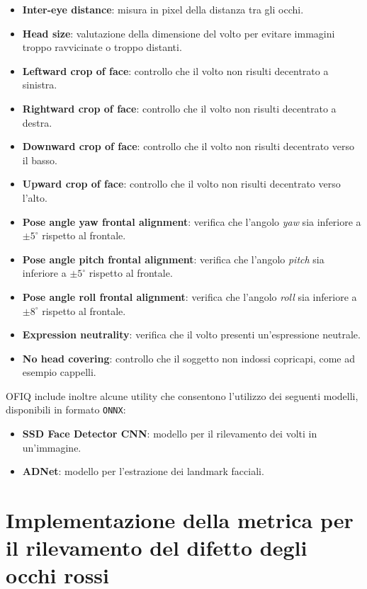 \documentclass[12pt,a4paper,openright,twoside]{book}
\begin{document}
\begin{itemize}
    \item \textbf{Inter-eye distance}: misura in pixel della distanza tra gli occhi.
    \item \textbf{Head size}: valutazione della dimensione del volto per evitare immagini troppo ravvicinate o troppo distanti.
    \item \textbf{Leftward crop of face}: controllo che il volto non risulti decentrato a sinistra.
    \item \textbf{Rightward crop of face}: controllo che il volto non risulti decentrato a destra.
    \item \textbf{Downward crop of face}: controllo che il volto non risulti decentrato verso il basso.
    \item \textbf{Upward crop of face}: controllo che il volto non risulti decentrato verso l'alto.
    \item \textbf{Pose angle yaw frontal alignment}: verifica che l'angolo \textit{yaw} sia inferiore a \(\pm 5^\circ\) rispetto al frontale.
    \item \textbf{Pose angle pitch frontal alignment}: verifica che l'angolo \textit{pitch} sia inferiore a \(\pm 5^\circ\) rispetto al frontale.
    \item \textbf{Pose angle roll frontal alignment}: verifica che l'angolo \textit{roll} sia inferiore a \(\pm 8^\circ\) rispetto al frontale.
    \item \textbf{Expression neutrality}: verifica che il volto presenti un'espressione neutrale.
    \item \textbf{No head covering}: controllo che il soggetto non indossi copricapi, come ad esempio cappelli.
\end{itemize}

OFIQ include inoltre alcune utility che consentono l'utilizzo dei seguenti modelli, disponibili in formato \texttt{ONNX}:  
\begin{itemize}
    \item \textbf{SSD Face Detector CNN}: modello per il rilevamento dei volti in un'immagine.
    \item \textbf{ADNet}: modello per l'estrazione dei landmark facciali.
\end{itemize}


\chapter{Implementazione della metrica per il rilevamento del difetto degli occhi rossi}
\label{chap:red-eye}
\end{document}
